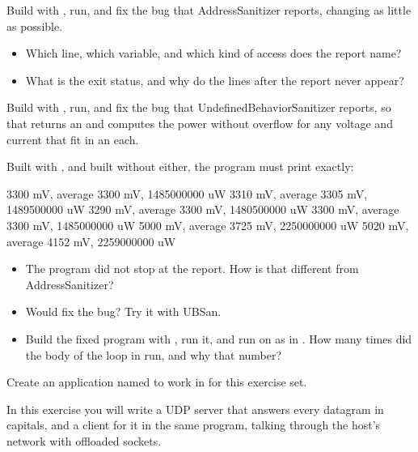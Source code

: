 \label{c6:ex:4.2}

Build with , run, and fix the bug that AddressSanitizer reports, changing as
little as possible.

\begin{itemize}
  \item Which line, which variable, and which kind of access does the report name?
  \item What is the exit status, and why do the lines after the report never appear?
\end{itemize}

\label{c6:ex:4.3}

Build with , run, and fix the bug that UndefinedBehaviorSanitizer reports, so
that  returns an  and computes the power without overflow for any
voltage and current that fit in an  each.

Built with , and built without either, the program must print
exactly:

\begin{console}
3300 mV, average 3300 mV, 1485000000 uW
3310 mV, average 3305 mV, 1489500000 uW
3290 mV, average 3300 mV, 1480500000 uW
3300 mV, average 3300 mV, 1485000000 uW
5000 mV, average 3725 mV, 2250000000 uW
5020 mV, average 4152 mV, 2259000000 uW
\end{console}

\begin{itemize}
  \item The program did not stop at the report. How is that different from AddressSanitizer?
  \item Would  fix the bug? Try it with UBSan.
  \item Build the fixed program with , run it, and run  on
     as in . How many times did the body of the loop in 
    run, and why that number?
\end{itemize}

\label{c6:set:5}
Create an application named  to work in for this exercise set.

\label{c6:ex:5.1}
In this exercise you will write a UDP server that answers every datagram in capitals, and a client
for it in the same program, talking through the host’s network with offloaded sockets.

